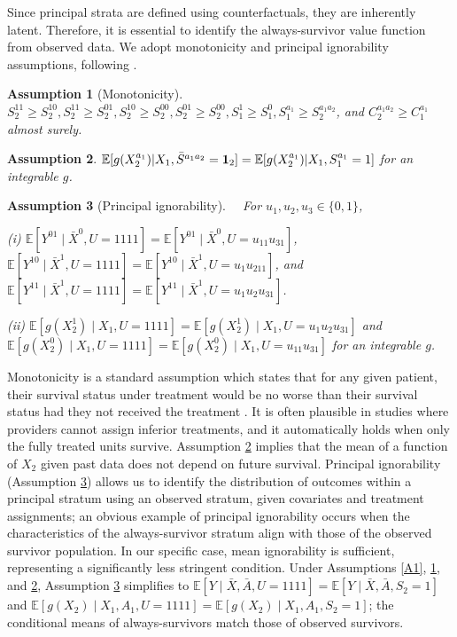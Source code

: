 \documentclass{article}
\newcommand{\E}{\mathbb{E}}
\newcommand{\tred}{{}}   %
\newtheorem{assumption}{Assumption}
\begin{document}
Since principal strata are defined using counterfactuals, they are inherently latent. Therefore, it is essential to identify the always-survivor value function from observed data. We adopt monotonicity and principal ignorability assumptions, following \cite{ps3}.
\begin{assumption}[Monotonicity] \label{A2} \
	$S_2^{11} \ge S_2^{10}, S_2^{11} \ge S_2^{01}, S_2^{10} \ge S_2^{00}, S_2^{01} \ge S_2^{00}, S_1^1 \ge S_1^0, S_1^{a_1} \ge S_2^{a_1a_2}$, 
	and $C_2^{a_1a_2} \ge C_1^{a_1}$ 
	almost surely.
\end{assumption}
\begin{assumption} \label{A:S2} 
	$\E[g(X_2^{a_1})|X_1,\bar S^{a_1a_2}={\bf 1}_2]=\E[g(X_2^{a_1})|X_1,S_1^{a_1}=1]$ for an integrable $g$.
\end{assumption}
\begin{assumption}[Principal ignorability] \ \label{A4} \ 
	For $u_1,u_2,u_3 \in \{0, 1\}$,
	
	(i) $\E[Y^{01} \mid \bar X^0, U=1111] = \E[Y^{01} \mid \bar X^0, U=u_11u_31]$, 
		$\E[Y^{10} \mid \bar X^1, U=1111] = \E[Y^{10} \mid \bar X^1, U=u_1u_211]$, and 
		$\E[Y^{11} \mid \bar X^1, U=1111] = \E[Y^{11} \mid \bar X^1, U=u_1u_2u_31]$.
			  
    (ii) $\E[g(X_2^1) \mid X_1, U=1111] = \E[g(X_2^1) \mid X_1, U=u_1u_2u_31]$ and
		 $\E[g(X_2^0) \mid X_1, U=1111] = \E[g(X_2^0) \mid X_1, U=u_11u_31]$ for an integrable $g$.
\end{assumption}
\tred{Monotonicity is a standard assumption which states that for any given patient, their survival status under treatment would be no worse than their survival status had they not received the treatment \citep{sommer1991estimating, follmann2006augmented}. It is often plausible in studies where providers cannot assign inferior treatments, and it automatically holds when only the fully treated units survive.}
Assumption \ref{A:S2} implies that the mean of a function of $X_2$ given past data does not depend on future survival.
Principal ignorability (Assumption \ref{A4}) allows us to identify the distribution of outcomes within a principal stratum using an observed stratum, given covariates and treatment assignments; 
\tred{an obvious example of principal ignorability occurs when the characteristics of the always-survivor stratum align with those of the observed survivor population.} 
In our specific case, mean ignorability is sufficient, representing a significantly less stringent condition. 
Under Assumptions \ref{A1}, \ref{A2}, and \ref{A:S2}, Assumption \ref{A4} simplifies to $\mathbb{E}[Y \mid \bar{X}, \bar{A}, U = 1111] = \mathbb{E}[Y \mid \bar{X}, \bar{A}, S_2 = 1]$ and $\E[g(X_2) \mid X_1, A_1, U = 1111] = \E[g(X_2) \mid X_1, A_1, S_2 = 1]$; the conditional means of always-survivors match those of observed survivors.
\end{document}
